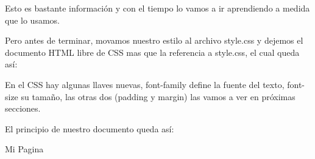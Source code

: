 \documentclass[letterpaper,10pt,spanish]{sphinxmanual}
\begin{document}
Esto es bastante información y con el tiempo lo vamos a ir aprendiendo a medida
que lo usamos.

Pero antes de terminar, movamos nuestro estilo al archivo style.css y dejemos
el documento HTML libre de CSS mas que la referencia a style.css, el cual queda
así:

%
\begin{sphinxVerbatim}[commandchars=\\\{\}]
 
   
   

   
   

    
   

 
   

   
   
\end{sphinxVerbatim}

En el CSS hay algunas llaves nuevas, font-family define la fuente del texto,
font-size su tamaño, las otras dos (padding y margin) las vamos a ver en
próximas secciones.

El principio de nuestro documento queda así:

%
\begin{sphinxVerbatim}[commandchars=\\\{\}]
         
        Mi Pagina
          
\end{sphinxVerbatim}
\end{document}
